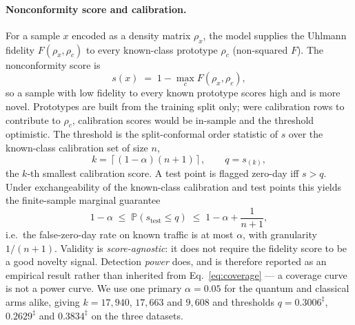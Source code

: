 \paragraph{Nonconformity score and calibration.}
For a sample $x$ encoded as a density matrix $\rho_x$, the model supplies the Uhlmann fidelity
$F(\rho_x, \rho_c)$ to every known-class prototype $\rho_c$ (non-squared $F$). The nonconformity score is
\begin{equation}
s(x) \;=\; 1 - \max_{c} F(\rho_x, \rho_c),
\end{equation}
so a sample with low fidelity to every known prototype scores high and is more novel. Prototypes are built
from the training split only; were calibration rows to contribute to $\rho_c$, calibration scores would be
in-sample and the threshold optimistic. The threshold is the split-conformal order statistic of $s$ over the
known-class calibration set of size $n$,
\begin{equation}
k = \left\lceil (1-\alpha)(n+1) \right\rceil, \qquad q = s_{(k)},
\end{equation}
the $k$-th smallest calibration score. A test point is flagged zero-day iff $s > q$. Under exchangeability
of the known-class calibration and test points this yields the finite-sample marginal guarantee
\begin{equation}
1 - \alpha \;\leq\; \mathbb{P}(s_{\mathrm{test}} \leq q) \;\leq\; 1 - \alpha + \frac{1}{n+1},
\label{eq:coverage}
\end{equation}
i.e.\ the false-zero-day rate on known traffic is at most $\alpha$, with granularity $1/(n+1)$. Validity is
\emph{score-agnostic}: it does not require the fidelity score to be a good novelty signal. Detection
\emph{power} does, and is therefore reported as an empirical result rather than inherited from
Eq.~\eqref{eq:coverage} --- a coverage curve is not a power curve. We use one primary $\alpha = 0.05$ for
the quantum and classical arms alike, giving $k = 17{,}940$, $17{,}663$ and $9{,}608$ and thresholds
$q = 0.3006^{\ddag}$, $0.2629^{\ddag}$ and $0.3834^{\ddag}$ on the three datasets.

